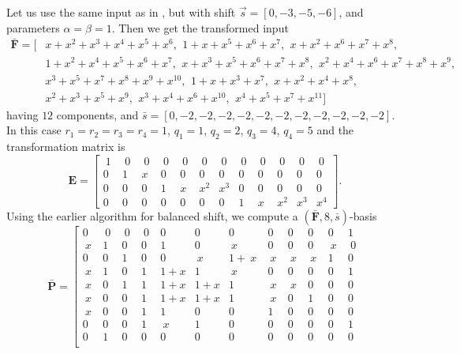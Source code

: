 \begin{exmp}
\label{exm:unbalancedShift} Let us use the same input as in ,
but with shift $\vec{s}=[0,-3,-5,-6]$, and parameters $\alpha=\beta=1$.
Then we get the transformed input \begin{align*}
\bar{\mathbf{F}}=[ & x+x^{2}+x^{3}+x^{4}+x^{5}+x^{6},\,~1+x+x^{5}+x^{6}+x^{7},\,~x+x^{2}+x^{6}+x^{7}+x^{8},\\
 & 1+x^{2}+x^{4}+x^{5}+x^{6}+x^{7},\,~x+x^{3}+x^{5}+x^{6}+x^{7}+x^{8},\,~x^{2}+x^{4}+x^{6}+x^{7}+x^{8}+x^{9},\\
 & x^{3}+x^{5}+x^{7}+x^{8}+x^{9}+x^{10},\,~1+x+x^{3}+x^{7},\,~x+x^{2}+x^{4}+x^{8},\\
 & x^{2}+x^{3}+x^{5}+x^{9},\,~x^{3}+x^{4}+x^{6}+x^{10},\,~x^{4}+x^{5}+x^{7}+x^{11}]\end{align*}
 having $12$ components, and $\bar{s}=[0,-2,-2,-2,-2,-2,-2,-2,-2,-2,-2,-2]$.
In this case $r_{1}=r_{2}=r_{3}=r_{4}=1$, $q_{1}=1$, $q_{2}=2$,
$q_{3}=4$, $q_{4}=5$ and the transformation matrix is \[
\mathbf{E}=\left[{\begin{array}{c|cc|cccc|ccccc}
~1~ & ~0~ & ~0~ & ~0~ & ~0~ & ~0~ & ~0~ & ~0~ & ~0~ & ~0~ & ~0~ & ~0~\\
\hline 0 & 1 & x & 0 & 0 & 0 & 0 & 0 & 0 & 0 & 0 & 0\\
\hline 0 & 0 & 0 & 1 & x & x^{2} & x^{3} & 0 & 0 & 0 & 0 & 0\\
\hline 0 & 0 & 0 & 0 & 0 & 0 & 0 & 1 & x & x^{2} & x^{3} & x^{4}\end{array}}\right].\]
 Using the earlier algorithm for balanced shift, we compute a $(\bar{\mathbf{F}},8,\bar{s})$-basis
\[
\bar{\mathbf{P}}=\left[{\begin{array}{cccccccccccc}
0 & ~0~ & ~0~ & ~0~ & 0 & 0 & 0 & 0 & 0 & 0 & 0 & 1\\
\hline ~x~ & 1 & 0 & 0 & 1 & 0 & ~x~ & 0 & 0 & 0 & ~x~ & ~0~\\
0 & 0 & 1 & 0 & 0 & ~x~ & 1+~x~ & ~x~ & ~x~ & ~x~ & 1 & 0\\
\hline ~x~ & 1 & 0 & 1 & 1+x & 1 & ~x~ & 0 & 0 & 0 & 0 & 1\\
~x~ & 0 & 1 & 1 & 1+x & 1+x & 1 & ~x~ & ~x~ & 0 & 0 & 0\\
~x~ & 0 & 0 & 1 & 1+x & 1+x & 1 & ~x~ & 0 & 1 & 0 & 0\\
~x~ & 0 & 0 & 1 & 1 & 0 & 0 & 1 & 0 & 0 & 0 & 0\\
\hline 0 & 0 & 0 & 1 & ~x~ & 1 & 0 & 0 & 0 & 0 & 0 & 1\\
0 & 1 & 0 & 0 & 0 & 0 & 0 & 0 & 0 & 0 & 0 & 0\\

\end{array}}\]
\end{exmp}
